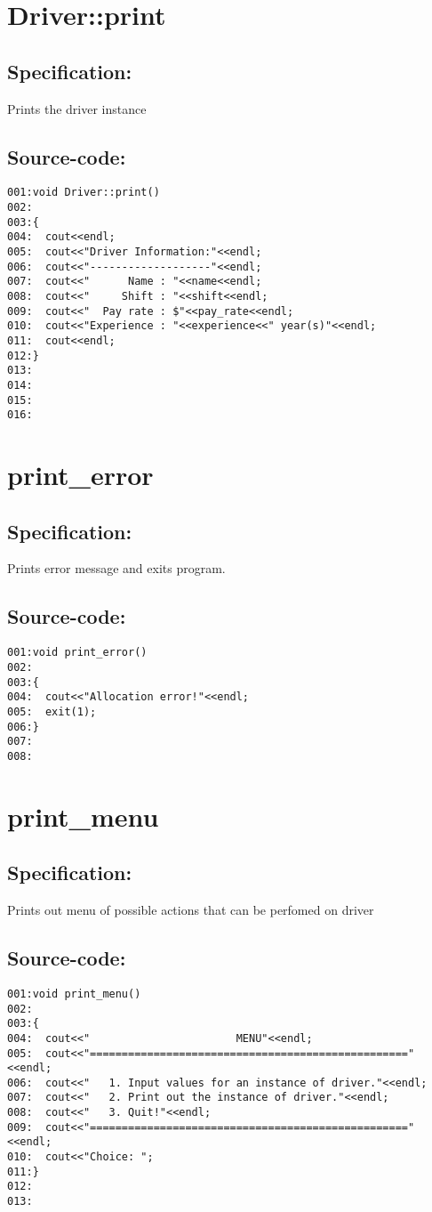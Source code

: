 \section{Driver::print}
\subsection*{Specification:}
Prints the driver instance
\subsection*{Source-code:}
\begin{verbatim}
001:void Driver::print()
002:
003:{
004:  cout<<endl;
005:  cout<<"Driver Information:"<<endl;
006:  cout<<"-------------------"<<endl;
007:  cout<<"      Name : "<<name<<endl;
008:  cout<<"     Shift : "<<shift<<endl;
009:  cout<<"  Pay rate : $"<<pay_rate<<endl;
010:  cout<<"Experience : "<<experience<<" year(s)"<<endl;
011:  cout<<endl;
012:}
013:
014:
015:
016:
\end{verbatim}
\section{print\_error}
\subsection*{Specification:}
Prints error message and exits program.
\subsection*{Source-code:}
\begin{verbatim}
001:void print_error()
002:      
003:{
004:  cout<<"Allocation error!"<<endl;
005:  exit(1);
006:}
007:
008:
\end{verbatim}
\section{print\_menu}
\subsection*{Specification:}
Prints out menu of possible actions that can be perfomed
  on driver
\subsection*{Source-code:}
\begin{verbatim}
001:void print_menu()
002:  
003:{
004:  cout<<"                       MENU"<<endl;
005:  cout<<"=================================================="<<endl;
006:  cout<<"   1. Input values for an instance of driver."<<endl;
007:  cout<<"   2. Print out the instance of driver."<<endl;
008:  cout<<"   3. Quit!"<<endl;
009:  cout<<"=================================================="<<endl;
010:  cout<<"Choice: ";
011:}
012:
013:
\end{verbatim}
